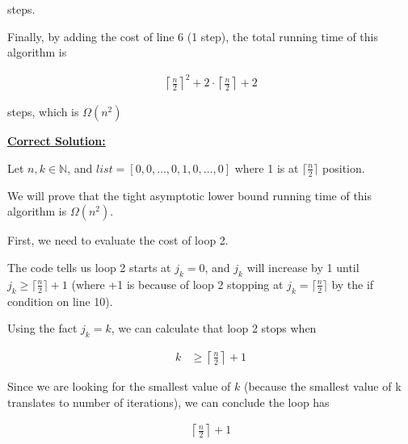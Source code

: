 \documentclass[12pt]{article}
\begin{document}
\begin{enumerate}[a.]
    steps.

    \bigskip

    Finally, by adding the cost of line 6 (1 step), the total running time of this algorithm is

    \begin{align}
        \left\lceil \frac{n}{2} \right\rceil^2 + 2 \cdot \left\lceil \frac{n}{2} \right\rceil + 2
    \end{align}

    steps, which is $\Omega(n^2)$

    \bigskip

    \begin{mdframed}
        \underline{\textbf{Correct Solution:}}

        \bigskip

        Let $n,k \in \mathbb{N}$, and $list = [0,0,\dots,0,1,0,\dots,0]$ where 1 is
        at $\lceil \frac{n}{2} \rceil$ position.

        \bigskip

        We will prove that the tight asymptotic lower bound running time of this
        algorithm is $\Omega(n^2)$.

        \bigskip

        First, we need to evaluate the cost of loop 2.

        \bigskip

        The code tells us loop 2 starts at $j_k = 0$, and $j_k$ will increase by 1 until
        $j_k \geq \lceil \frac{n}{2} \rceil + 1$ (where +1 is because of loop 2
        stopping at $j_k = \lceil \frac{n}{2} \rceil$ by the if condition on line 10).

        \bigskip

        Using the fact \color{red}$j_k = k$\color{black}, we can calculate that
        loop 2 stops when

        \setcounter{equation}{0}
        \begin{align}
            k &\geq \left\lceil \frac{n}{2} \right\rceil + 1
        \end{align}

        \bigskip

        Since we are looking for the smallest value of $k$ (because the smallest value of
        k translates to number of iterations), we can conclude the
        loop has

        \color{red}
        \begin{align}
            \left\lceil \frac{n}{2} \right\rceil + 1
        \end{align}
        \color{black}


\end{mdframed}
\end{enumerate}
\end{document}
